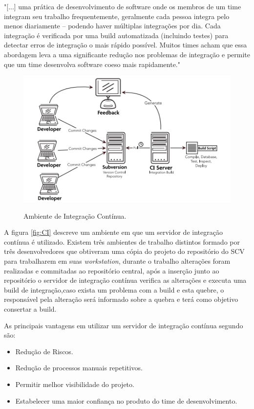 \begin{citacao}
"[...] uma prática de desenvolvimento de software onde os membros de um time integram seu trabalho frequentemente, geralmente cada pessoa integra pelo menos diariamente – podendo haver múltiplas integrações por dia. Cada integração é verificada por uma build automatizada (incluindo testes) para detectar erros de integração o mais rápido possível. Muitos times acham que essa abordagem leva a uma significante redução nos problemas de integração e permite que um time desenvolva software coeso mais rapidamente." 
\end{citacao}

\begin{figure}[h]
\centering
\caption[Ambiente de Integração Contínua]{Ambiente de Integração Contínua.}
\includegraphics[width=0.7\linewidth]{./images/CI}
\label{fig:CI}
\end{figure}

A figura \autoref{fig:CI} descreve um ambiente em que um servidor de integração contínua é utilizado. Existem três ambientes de trabalho distintos formado por três desenvolvedores que obtiveram uma cópia do projeto do repositório do SCV para trabalharem em suas \textit{workstation}, durante o trabalho alterações foram realizadas e commitadas ao repositório central, após a inserção junto ao repositório o servidor de integração contínua verifica as alterações e executa uma build de integração,caso exista um problema com a build e esta quebre, o responsável pela alteração será informado sobre a quebra e terá como objetivo consertar a build.

As principais vantagens em utilizar um servidor de integração contínua segundo  são:

\begin{itemize}
\item Redução de Riscos.
\item Redução de processos manuais repetitivos.
\item Permitir melhor visibilidade do projeto.
\item Estabelecer uma maior confiança no produto do time de desenvolvimento.
\end{itemize}

